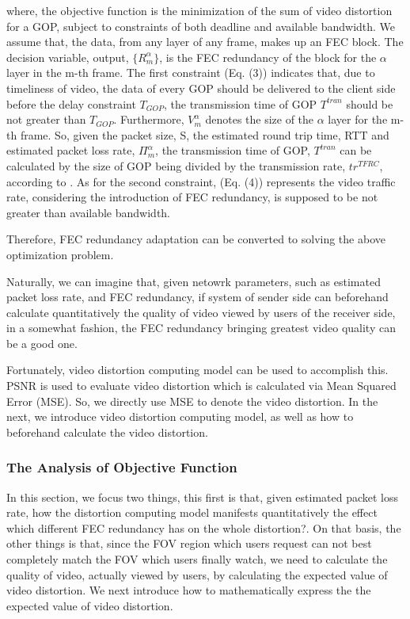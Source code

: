where, the objective function is the minimization of the sum of video distortion for a GOP, subject to constraints of both deadline and available bandwidth. We assume that, the data, from any layer of any frame, makes up an FEC block. The decision variable, \ie output, $\{ R_m^\alpha \}$, is the FEC redundancy of the block for the $\alpha$ layer in the m-th frame. The first constraint (Eq. (3)) indicates that, due to timeliness of video, the data of every GOP should be delivered to the client side before the delay constraint $T_{GOP}$, \ie the transmission time of GOP $T^{tran}$ should be not greater than $T_{GOP}$.
Furthermore, ${V_m^\alpha }$ denotes the size of the $\alpha$ layer for the m-th frame. So, given the packet size, S, the estimated round trip time, RTT and estimated packet loss rate, $\Pi_m^\alpha$, the transmission time of GOP, $T^{tran}$ can be calculated by the size of GOP being divided by the transmission rate, $t{r^{TFRC}}$, according to \cite{TRFC}. 
As for the second constraint, (Eq. (4)) represents the video traffic rate, considering the introduction of FEC redundancy, is supposed to be not greater than available bandwidth.

Therefore, FEC redundancy adaptation can be converted to solving the above optimization problem.

Naturally, we can imagine that, given netowrk parameters, such as estimated packet loss rate, and FEC redundancy, if system of sender side can beforehand calculate quantitatively the quality of video viewed by users of the receiver side, in a somewhat fashion, the FEC redundancy bringing greatest video quality can be a good one.

Fortunately, video distortion computing model can be used to accomplish this. PSNR is used to evaluate video distortion which is calculated via Mean Squared Error (MSE). So, we directly use MSE to denote the video distortion.
In the next, we introduce video distortion computing model, as well as how to beforehand calculate the video distortion.

\subsubsection{The Analysis of Objective Function}
In this section, we focus two things, this first is that, given estimated packet loss rate, how the distortion computing model manifests quantitatively the effect which different FEC redundancy has on the whole distortion?. 
On that basis, the other things is that, since the FOV region which users request can not best completely match the FOV which users finally watch, we need to calculate the quality of video, actually viewed by users, by calculating the expected value of video distortion. 
We next introduce how to mathematically express the the expected value of video distortion. 

